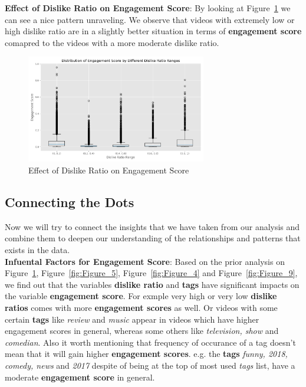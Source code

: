 \documentclass[a4paper,12pt]{article}
\begin{document}
\noindent \textbf{Effect of Dislike Ratio on Engagement Score}: By looking at Figure~\ref{fig:Figure_16} we can see a nice pattern unraveling. We observe that videos with extremely low or high dislike ratio are in a slightly better 
situation in terms of \textbf{engagement score} comapred to the videos with a more moderate dislike ratio.   

\begin{figure}[H]
    \centering
    \includegraphics[width=0.7\textwidth]{./images/distro_of_eng_score_diff_dis_ratio_ranges.png}
    \caption{Effect of Dislike Ratio on Engagement Score}
    \label{fig:Figure_16}
\end{figure}


\subsection*{Connecting the Dots}
Now we will try to connect the insights that we have taken from our analysis and combine them to deepen our understanding of the relationships and patterns that exists in the data. \\ 

\noindent \textbf{Infuental Factors for Engagement Score}: Based on the prior analysis on Figure~\ref{fig:Figure_16}, Figure~\ref{fig:Figure_5}, Figure~\ref{fig:Figure_4} and Figure~\ref{fig:Figure_9},  we find out that 
the variables \textbf{dislike ratio} and \textbf{tags} have significant impacts on the variable \textbf{engagement score}. For exmple very high or very low \textbf{dislike ratios} comes with 
more \textbf{engagement scores} as well. Or videos with some certain \textbf{tags} like \textit{review} and \textit{music} appear in videos which have higher engagement scores in general, 
whereas some others like \textit{television, show} and \textit{comedian}. Also it worth mentioning that frequency of occurance of a tag doesn't mean that it will gain higher \textbf{engagement scores}. e.g. the \textbf{tags} \textit{funny, 2018, comedy, news} 
and \textit{2017} despite of being at the top of most used \textit{tags} list, have a moderate \textbf{engagement score} in general. \\
\end{document}
